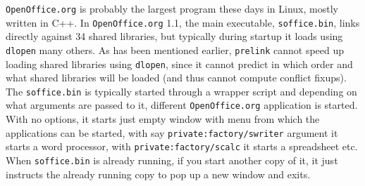 \documentclass[twoside]{article}
\def\tts#1{\texttt{\small #1}}
\begin{document}
\tts{OpenOffice.org} is probably the largest program these days in Linux,
mostly written in C++.  In \tts{OpenOffice.org} 1.1, the main executable,
\tts{soffice.bin}, links directly against 34 shared libraries, but typically
during startup it loads using \tts{dlopen} many others.  As has been
mentioned earlier, \tts{prelink} cannot speed up loading shared libraries
using \tts{dlopen}, since it cannot predict in which order and what
shared libraries will be loaded (and thus cannot compute conflict fixups).
The \tts{soffice.bin} is typically started through a wrapper script
and depending on what arguments are passed to it, different
\tts{OpenOffice.org} application is started.  With no options, it starts
just empty window with menu from which the applications can be started,
with say \tts{private:factory/swriter} argument it starts
a word processor, with \tts{private:factory/scalc} it starts a spreadsheet
etc.  When \tts{soffice.bin} is already running, if you start another
copy of it, it just instructs the already running copy to pop up a new
window and exits.
\end{document}
